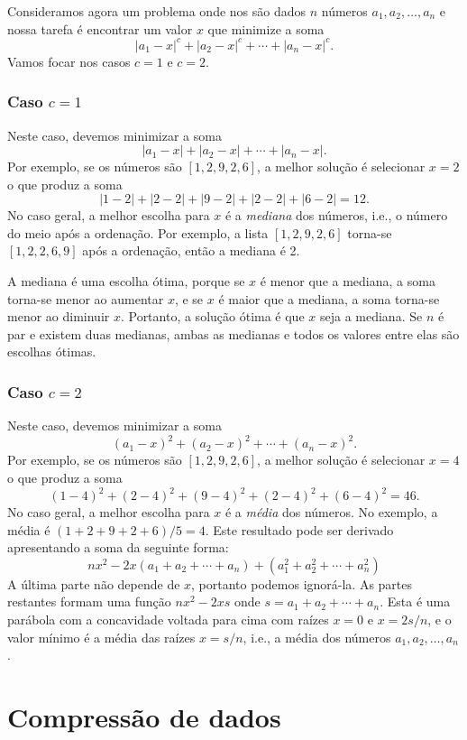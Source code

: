 Consideramos agora um problema onde
nos são dados $n$ números $a_1,a_2,\ldots,a_n$
e nossa tarefa é encontrar um valor $x$
que minimize a soma
\[|a_1-x|^c+|a_2-x|^c+\cdots+|a_n-x|^c.\]
Vamos focar nos casos $c=1$ e $c=2$.

\subsubsection{Caso $c=1$}

Neste caso, devemos minimizar a soma
\[|a_1-x|+|a_2-x|+\cdots+|a_n-x|.\]
Por exemplo, se os números são $[1,2,9,2,6]$,
a melhor solução é selecionar $x=2$
o que produz a soma
\[
|1-2|+|2-2|+|9-2|+|2-2|+|6-2|=12.
\]
No caso geral, a melhor escolha para $x$
é a \textit{mediana} dos números,
i.e., o número do meio após a ordenação.
Por exemplo, a lista $[1,2,9,2,6]$
torna-se $[1,2,2,6,9]$ após a ordenação,
então a mediana é 2.

A mediana é uma escolha ótima,
porque se $x$ é menor que a mediana,
a soma torna-se menor ao aumentar $x$,
e se $x$ é maior que a mediana,
a soma torna-se menor ao diminuir $x$.
Portanto, a solução ótima é que $x$
seja a mediana.
Se $n$ é par e existem duas medianas,
ambas as medianas e todos os valores entre elas
são escolhas ótimas.

\subsubsection{Caso $c=2$}

Neste caso, devemos minimizar a soma
\[(a_1-x)^2+(a_2-x)^2+\cdots+(a_n-x)^2.\]
Por exemplo, se os números são $[1,2,9,2,6]$,
a melhor solução é selecionar $x=4$
o que produz a soma
\[
(1-4)^2+(2-4)^2+(9-4)^2+(2-4)^2+(6-4)^2=46.
\]
No caso geral, a melhor escolha para $x$
é a \emph{média} dos números.
No exemplo, a média é $(1+2+9+2+6)/5=4$.
Este resultado pode ser derivado apresentando
a soma da seguinte forma:
\[
nx^2 - 2x(a_1+a_2+\cdots+a_n) + (a_1^2+a_2^2+\cdots+a_n^2)
\]
A última parte não depende de $x$,
portanto podemos ignorá-la.
As partes restantes formam uma função
$nx^2-2xs$ onde $s=a_1+a_2+\cdots+a_n$.
Esta é uma parábola com a concavidade voltada para cima
com raízes $x=0$ e $x=2s/n$,
e o valor mínimo é a média
das raízes $x=s/n$, i.e.,
a média dos números $a_1,a_2,\ldots,a_n$.

\section{Compressão de dados}

